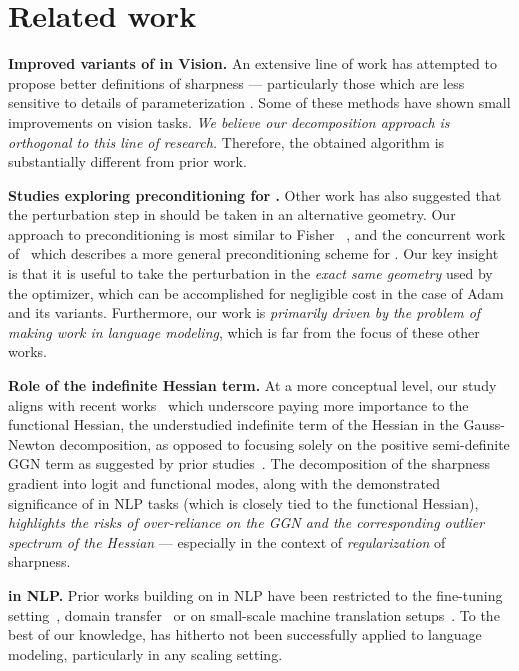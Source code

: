 \section{Related work}
\textbf{Improved variants of \SAM in Vision.} An extensive line of work has attempted to propose better definitions of sharpness --- particularly those which are less sensitive to
details of parameterization
\citep{kwon2021asam,tahmasebi2024universalclasssharpnessawareminimization,li2024enhancing}. Some of these methods 
have shown small improvements on vision tasks. \textit{We believe our decomposition approach is orthogonal to this line of research.} Therefore, the obtained \funcSAM algorithm is substantially different from  prior work.



\textbf{Studies exploring preconditioning for \SAM.} Other work has also suggested that the perturbation step in \SAM should be taken in an alternative geometry. Our approach to preconditioning is most
similar to Fisher \SAM~\citep{kim2022fisher}, and the concurrent work of~\citet{zhang2025preconditioned} which describes a more
general preconditioning scheme for \SAM. Our key insight is that it is useful to take the \SAM perturbation in the \emph{exact same geometry}
used by the optimizer, which can be accomplished for negligible cost in the case of Adam and its variants.
Furthermore, our work is \textit{primarily driven by the problem of making \SAM work in language modeling}, which is far from the focus of these other works.

\textbf{Role of the indefinite Hessian term.} At a more conceptual level, our study aligns with recent works~\citep{singh2021analytic,dauphin2024neglected} which underscore paying more importance to the functional Hessian, the understudied indefinite term of the Hessian in the Gauss-Newton decomposition, as opposed to focusing solely on the positive semi-definite GGN term as suggested by prior studies~\citep{sagun2018empiricalanalysishessianoverparametrized,papyan2019spectrumdeepnethessiansscale,jacot2020asymptoticspectrumhessiandnn}. The decomposition of the sharpness gradient into logit and functional modes, along with the demonstrated significance of \funcSAM in NLP tasks (which is closely tied to the functional Hessian),\textit{ highlights the risks of over-reliance on the GGN and the corresponding outlier spectrum of the Hessian} --- 
especially in the context of \emph{regularization} of sharpness.

\textbf{\SAM in NLP.} Prior works building on \SAM in NLP have been restricted to the fine-tuning setting~\citep{bahri2022sharpnessawareminimizationimproveslanguage}, domain transfer~\citep{sherborne2024trambridgingtrustregions} or on small-scale machine translation setups~\citep{li2024enhancing}.
To the best of our knowledge, \SAM has hitherto not been successfully applied to language modeling, particularly in any scaling
setting.